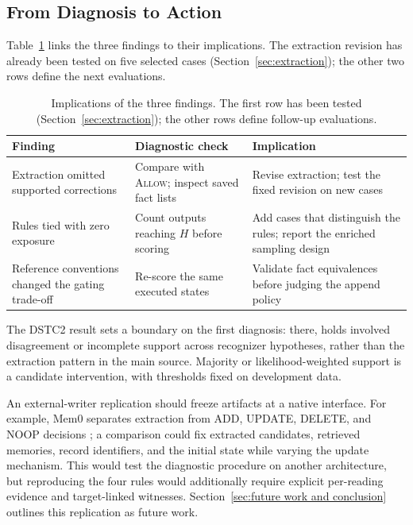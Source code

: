 \documentclass[acmsmall,review,anonymous]{acmart}
\newcommand{\allow}{\textsc{Allow}}
\begin{document}
\subsection{From Diagnosis to Action}\label{sec:action}
Table~\ref{tab:diag} links the three findings to their implications. The extraction revision has already been tested on five selected cases (Section~\ref{sec:extraction}); the other two rows define the next evaluations.

\begin{table}[tbp]
\centering
\caption{Implications of the three findings. The first row has been tested (Section~\ref{sec:extraction}); the other rows define follow-up evaluations.}\label{tab:diag}
\small
\setlength{\tabcolsep}{3pt}
\begin{tabular}{@{}>{\raggedright\arraybackslash}p{}>{\raggedright\arraybackslash}p{}>{\raggedright\arraybackslash}p{}@{}}
\toprule
\textbf{Finding} & \textbf{Diagnostic check} & \textbf{Implication} \\
\midrule
Extraction omitted supported corrections & Compare with \allow{}; inspect saved fact lists & Revise extraction; test the fixed revision on new cases \\
\addlinespace[2pt]
Rules tied with zero exposure & Count outputs reaching $H$ before scoring & Add cases that distinguish the rules; report the enriched sampling design \\
\addlinespace[2pt]
Reference conventions changed the gating trade-off & Re-score the same executed states & Validate fact equivalences before judging the append policy \\
\bottomrule
\end{tabular}
\end{table}

The DSTC2 result sets a boundary on the first diagnosis: there, holds involved disagreement or incomplete support across recognizer hypotheses, rather than the extraction pattern in the main source. Majority or likelihood-weighted support is a candidate intervention, with thresholds fixed on development data.

An external-writer replication should freeze artifacts at a native interface. For example, Mem0 separates extraction from ADD, UPDATE, DELETE, and NOOP decisions \cite{cite6}; a comparison could fix extracted candidates, retrieved memories, record identifiers, and the initial state while varying the update mechanism. This would test the diagnostic procedure on another architecture, but reproducing the four rules would additionally require explicit per-reading evidence and target-linked witnesses. Section~\ref{sec:future work and conclusion} outlines this replication as future work.
\end{document}

